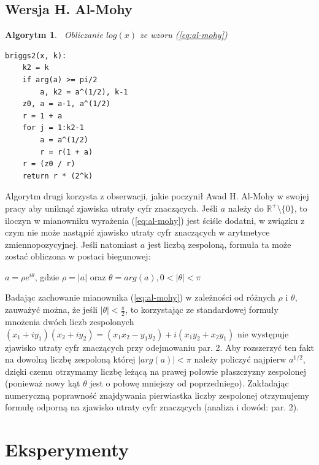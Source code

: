 \documentclass{article}
\newtheorem{alg}{Algorytm}
\begin{document}
\subsection{Wersja H. Al-Mohy}
\begin{alg}\, \textsf{Obliczanie $log(x)$ ze wzoru (\ref{eq:al-mohy})} \label{A:alg2}
\begin{lstlisting}
briggs2(x, k):
	k2 = k
	if arg(a) >= pi/2
		a, k2 = a^(1/2), k-1
	z0, a = a-1, a^(1/2)
	r = 1 + a
	for j = 1:k2-1
		a = a^(1/2)
		r = r(1 + a)
	r = (z0 / r)
	return r * (2^k)	
\end{lstlisting}
\end{alg}
	Algorytm drugi korzysta z obserwacji, jakie poczynił Awad H. Al-Mohy w swojej pracy aby uniknąć zjawiska utraty cyfr znaczących. Jeśli $a$ należy do $\mathbb{R}^+\setminus\{0\}$, to iloczyn w mianowniku wyrażenia (\ref{eq:al-mohy}) jest ściśle dodatni, w związku z czym nie może nastąpić zjawisko utraty cyfr znaczących w arytmetyce zmiennopozycyjnej. Jeśli natomiast $a$ jest liczbą zespoloną, formuła ta może zostać obliczona w postaci biegunowej:
	\begin{center} $a=\rho e^{i\theta}$, gdzie $\rho=|a|$ oraz $\theta=arg(a), 0 < |\theta| < \pi$ \end{center} 
Badając zachowanie mianownika (\ref{eq:al-mohy}) w zależności od różnych $\rho$ i $\theta$, zauważyć można, że jeśli $|\theta|<\frac{\pi}{2}$, to korzystając ze standardowej formuły mnożenia dwóch liczb zespolonych $(x_1+iy_1)(x_2+iy_2)=(x_1x_2-y_1y_2)+i(x_1y_2+x_2y_1)$  nie występuje zjawisko utraty cyfr znaczących przy odejmowaniu \cite{al-mohy11} par. 2. Aby rozszerzyć ten fakt na dowolną liczbę zespoloną której $|arg(a)|<\pi$ należy policzyć najpierw $a^{1/2}$, dzięki czemu otrzymamy liczbę leżącą na prawej połowie płaszczyzny zespolonej (ponieważ nowy kąt $\theta$ jest o połowę mniejszy od poprzedniego). Zakładając numeryczną poprawność znajdywania pierwiastka liczby zespolonej otrzymujemy formułę odporną na zjawisko utraty cyfr znaczących (analiza i dowód: \cite{al-mohy11} par. 2).

\section{Eksperymenty}
\end{document}
